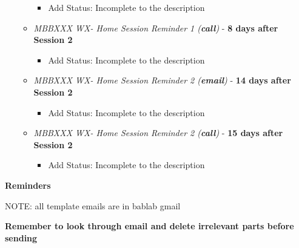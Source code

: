 \documentclass[]{book}
\providecommand{\tightlist}{%
  \setlength{\itemsep}{0pt}\setlength{\parskip}{0pt}}
\begin{document}
\begin{itemize}
\begin{itemize}
    \begin{itemize}
    \tightlist
    \item
      Add Status: Incomplete to the description
    \end{itemize}
  \item
    \emph{MBBXXX WX- Home Session Reminder 1 (\textbf{call})} - \textbf{8 days after Session 2}

    \begin{itemize}
    \tightlist
    \item
      Add Status: Incomplete to the description
    \end{itemize}
  \item
    \emph{MBBXXX WX- Home Session Reminder 2 (\textbf{email})} - \textbf{14 days after Session 2}

    \begin{itemize}
    \tightlist
    \item
      Add Status: Incomplete to the description
    \end{itemize}
  \item
    \emph{MBBXXX WX- Home Session Reminder 2 (\textbf{call})} - \textbf{15 days after Session 2}

    \begin{itemize}
    \tightlist
    \item
      Add Status: Incomplete to the description
    \end{itemize}
  \end{itemize}
\end{itemize}

\textbf{Reminders}

NOTE: all template emails are in bablab gmail

\textbf{Remember to look through email and delete irrelevant parts before sending}
\end{document}
